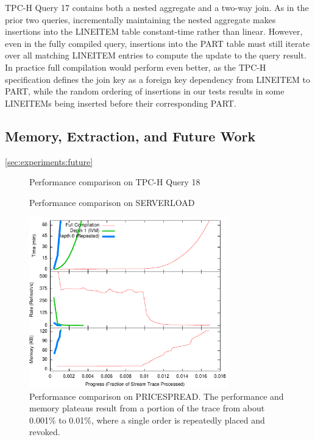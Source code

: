 TPC-H Query 17 contains both a nested aggregate and a two-way join.  As in the prior two queries, incrementally maintaining the nested aggregate makes insertions into the LINEITEM table constant-time rather than linear.  However, even in the fully compiled query, insertions into the PART table must still iterate over all matching LINEITEM entries to compute the update to the query result.  In practice full compilation would perform even better, as the TPC-H specification defines the join key as a foreign key dependency from LINEITEM to PART, while the random ordering of insertions in our tests results in some LINEITEMs being inserted before their corresponding PART.

\subsection{Memory, Extraction, and Future Work}
\ref{sec:experiments:future}
\begin{figure}
\begin{center}
\caption{Performance comparison on TPC-H Query 18}
\label{fig:experiments:tpch18}
\end{center}
\end{figure}

\begin{figure}
\begin{center}
\caption{Performance comparison on SERVERLOAD}
\label{fig:experiments:serverload}
\end{center}
\end{figure}

\begin{figure}
\begin{center}
\includegraphics[width=3.4in]{../graphs/graphs/unified_pricespread.pdf}
\caption{Performance comparison on PRICESPREAD.  The performance and memory plateaus result from a portion of the trace from about 0.001\% to 0.01\%, where a single order is repeatedly placed and revoked.}
\label{fig:experiments:pricespread}
\end{center}
\end{figure}

